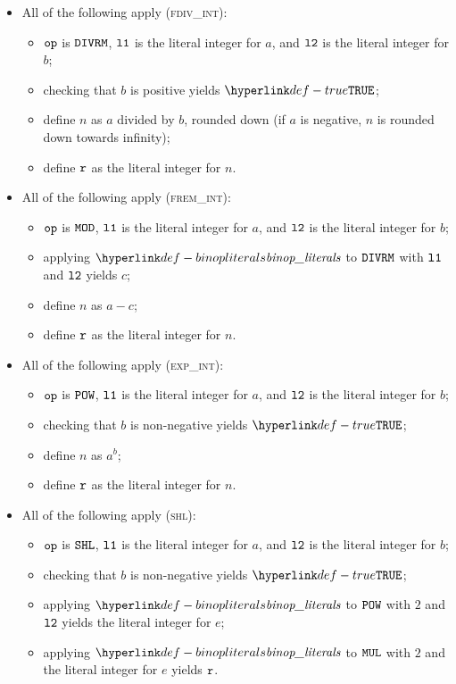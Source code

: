 \documentclass{book}
\newcommand\ProseOrTypeError[0]{\ProseTerminateAs{\TypeErrorConfig}}
\begin{document}
\begin{itemize}
  \item All of the following apply (\textsc{fdiv\_int}):
  \begin{itemize}
    \item $\texttt{op}$ is $\texttt{DIVRM}$, $\texttt{l1}$ is the literal integer for $a$, and $\texttt{l2}$ is the literal integer for $b$;
    \item checking that $b$ is positive yields $\True$\ProseOrTypeError;
    \item define $n$ as $a$ divided by $b$, rounded down (if $a$ is negative, $n$ is rounded down towards infinity);
    \item define $\texttt{r}$ as the literal integer for $n$.
  \end{itemize}

  \item All of the following apply (\textsc{frem\_int}):
  \begin{itemize}
    \item $\texttt{op}$ is $\texttt{MOD}$, $\texttt{l1}$ is the literal integer for $a$, and $\texttt{l2}$ is the literal integer for $b$;
    \item applying $\binopliterals$ to $\texttt{DIVRM}$ with $\texttt{l1}$ and $\texttt{l2}$ yields $c$\ProseOrTypeError;
    \item define $n$ as $a-c$;
    \item define $\texttt{r}$ as the literal integer for $n$.
  \end{itemize}

  \item All of the following apply (\textsc{exp\_int}):
  \begin{itemize}
    \item $\texttt{op}$ is $\texttt{POW}$, $\texttt{l1}$ is the literal integer for $a$, and $\texttt{l2}$ is the literal integer for $b$;
    \item checking that $b$ is non-negative yields $\True$\ProseOrTypeError;
    \item define $n$ as $a^b$;
    \item define $\texttt{r}$ as the literal integer for $n$.
  \end{itemize}

  \item All of the following apply (\textsc{shl}):
  \begin{itemize}
    \item $\texttt{op}$ is $\texttt{SHL}$, $\texttt{l1}$ is the literal integer for $a$, and $\texttt{l2}$ is the literal integer for $b$;
    \item checking that $b$ is non-negative yields $\True$\ProseOrTypeError;
    \item applying $\binopliterals$ to $\texttt{POW}$ with $2$ and $\texttt{l2}$ yields the literal integer for $e$;
    \item applying $\binopliterals$ to $\texttt{MUL}$ with $2$ and the literal integer for $e$ yields $\texttt{r}$.
  \end{itemize}


\end{itemize}
\end{document}
